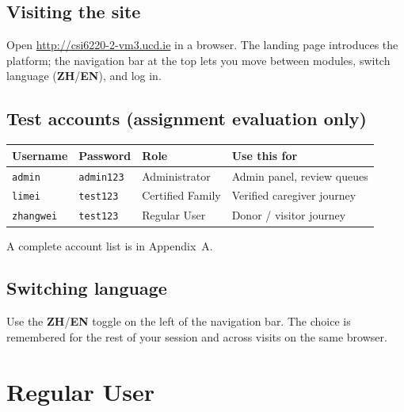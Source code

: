 \subsection{Visiting the site}
Open \url{http://csi6220-2-vm3.ucd.ie} in a browser. The landing page
introduces the platform; the navigation bar at the top lets you move
between modules, switch language (\textbf{ZH}/\textbf{EN}), and log in.

\subsection{Test accounts (assignment evaluation only)}
\begin{tabularx}{\linewidth}{@{} l l L{4cm} X @{}}
  \toprule
  \textbf{Username} & \textbf{Password} & \textbf{Role} & \textbf{Use this for} \\
  \midrule
  \texttt{admin}    & \texttt{admin123} & Administrator       & Admin
                                                                panel,
                                                                review
                                                                queues \\
  \texttt{limei}    & \texttt{test123}  & Certified Family    & Verified
                                                                caregiver
                                                                journey \\
  \texttt{zhangwei} & \texttt{test123}  & Regular User        & Donor /
                                                                visitor
                                                                journey \\
  \bottomrule
\end{tabularx}

\noindent
A complete account list is in Appendix~A.

\subsection{Switching language}
Use the \textbf{ZH}/\textbf{EN} toggle on the left of the navigation
bar. The choice is remembered for the rest of your session and across
visits on the same browser.

\section{Regular User}

